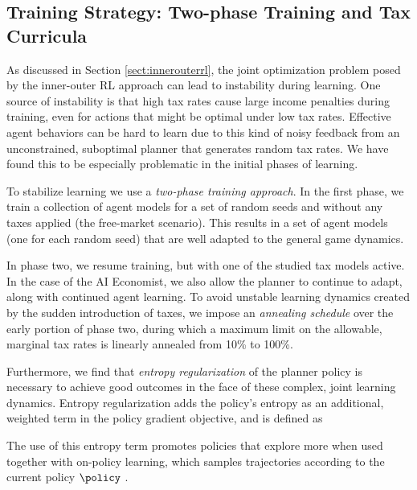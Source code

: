\subsection{Training Strategy: Two-phase Training and Tax Curricula}
\label{sec:trainingstrategy}
As discussed in Section \ref{sect:innerouterrl}, the joint optimization problem posed by the inner-outer RL approach can lead to instability during learning.
One source of instability is that high tax rates cause large income penalties  during training, even for actions that might be optimal under low tax rates. Effective agent behaviors can be hard to learn due to this kind of noisy  feedback from an unconstrained, suboptimal planner  that generates random tax rates. We have found this to be especially problematic in the initial  phases of learning.

To stabilize learning we use a {\em two-phase training approach}.
In the first phase, we train a collection of agent models for a set of random seeds and without any taxes applied (the free-market scenario). This results in a set of agent models (one for each random seed) that are well adapted to the general game dynamics.

In phase two, we resume training, but with one of the studied tax models active.
In the case of the AI Economist, we also allow the planner to continue to adapt, along with  continued agent learning.
To avoid unstable learning dynamics created by the sudden introduction of taxes, we impose an {\em annealing schedule} over the early portion of phase two, during which a maximum limit on the allowable, marginal tax rates is linearly annealed from 10\% to 100\%.

Furthermore, we find that  {\em  entropy regularization} of the planner policy is necessary to achieve good outcomes in the face of these complex, joint learning dynamics.
Entropy regularization adds the policy's entropy as an additional, weighted term in the policy gradient objective, and is defined as

The use of this entropy term promotes  policies that explore more when used together with on-policy learning, which samples   trajectories according to the current policy $\policy$ \citep{williams1991function,mnih2016asynchronous}.

